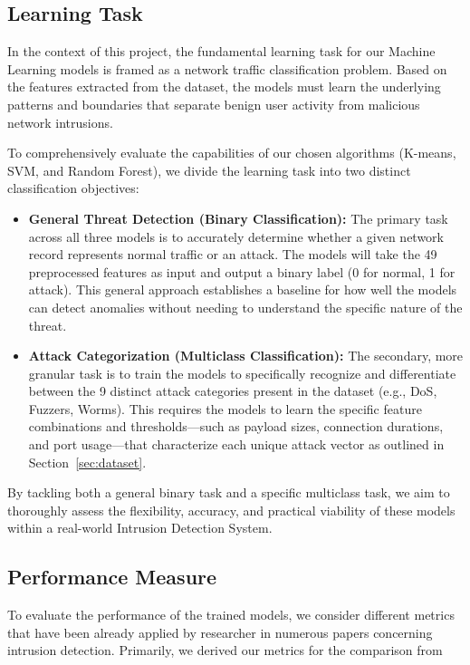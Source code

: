 \subsection{Learning Task}

In the context of this project, the fundamental learning task for our Machine Learning models is framed as a network traffic classification problem. Based on the features extracted from the dataset, the models must learn the underlying patterns and boundaries that separate benign user activity from malicious network intrusions. 

\nextparagraph
To comprehensively evaluate the capabilities of our chosen algorithms (K-means, SVM, and Random Forest), we divide the learning task into two distinct classification objectives:

\begin{itemize}
    \item \textbf{General Threat Detection (Binary Classification):} The primary task across all three models is to accurately determine whether a given network record represents normal traffic or an attack. The models will take the 49 preprocessed features as input and output a binary label (0 for normal, 1 for attack). This general approach establishes a baseline for how well the models can detect anomalies without needing to understand the specific nature of the threat.
    
    \item \textbf{Attack Categorization (Multiclass Classification):} The secondary, more granular task is to train the models to specifically recognize and differentiate between the 9 distinct attack categories present in the dataset (e.g., DoS, Fuzzers, Worms). This requires the models to learn the specific feature combinations and thresholds—such as payload sizes, connection durations, and port usage—that characterize each unique attack vector as outlined in Section~\ref{sec:dataset}.
\end{itemize}

\nextparagraph
By tackling both a general binary task and a specific multiclass task, we aim to thoroughly assess the flexibility, accuracy, and practical viability of these models within a real-world Intrusion Detection System.

\subsection{Performance Measure}
To evaluate the performance of the trained models, we consider different metrics that have been already applied by researcher in numerous papers concerning intrusion detection. Primarily, we derived our metrics for the comparison from \cite{SVM}

